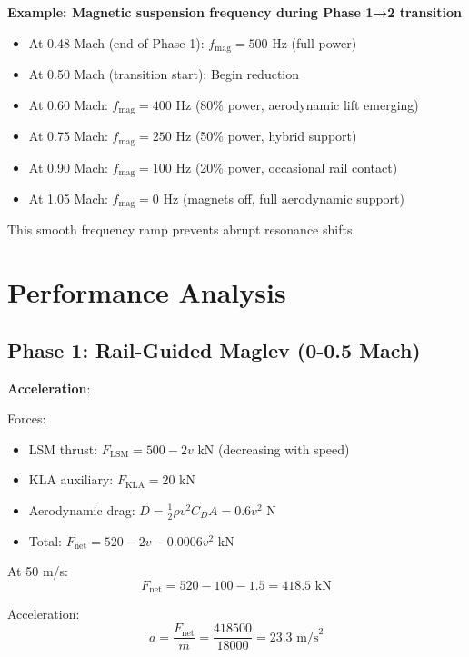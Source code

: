 \documentclass[12pt,a4paper]{article}
\begin{document}
\textbf{Example: Magnetic suspension frequency during Phase 1→2 transition}

\begin{itemize}
\item At 0.48 Mach (end of Phase 1): $f_{\text{mag}} = 500$ Hz (full power)
\item At 0.50 Mach (transition start): Begin reduction
\item At 0.60 Mach: $f_{\text{mag}} = 400$ Hz (80\% power, aerodynamic lift emerging)
\item At 0.75 Mach: $f_{\text{mag}} = 250$ Hz (50\% power, hybrid support)
\item At 0.90 Mach: $f_{\text{mag}} = 100$ Hz (20\% power, occasional rail contact)
\item At 1.05 Mach: $f_{\text{mag}} = 0$ Hz (magnets off, full aerodynamic support)
\end{itemize}

This smooth frequency ramp prevents abrupt resonance shifts.

\section{Performance Analysis}

\subsection{Phase 1: Rail-Guided Maglev (0-0.5 Mach)}

\textbf{Acceleration}:

Forces:
\begin{itemize}
\item LSM thrust: $F_{\text{LSM}} = 500 - 2v$ kN (decreasing with speed)
\item KLA auxiliary: $F_{\text{KLA}} = 20$ kN
\item Aerodynamic drag: $D = \frac{1}{2} \rho v^2 C_D A = 0.6 v^2$ N
\item Total: $F_{\text{net}} = 520 - 2v - 0.0006 v^2$ kN
\end{itemize}

At 50 m/s:
\begin{equation}
F_{\text{net}} = 520 - 100 - 1.5 = 418.5 \text{ kN}
\end{equation}

Acceleration:
\begin{equation}
a = \frac{F_{\text{net}}}{m} = \frac{418500}{18000} = 23.3 \text{ m/s}^2
\end{equation}
\end{document}
